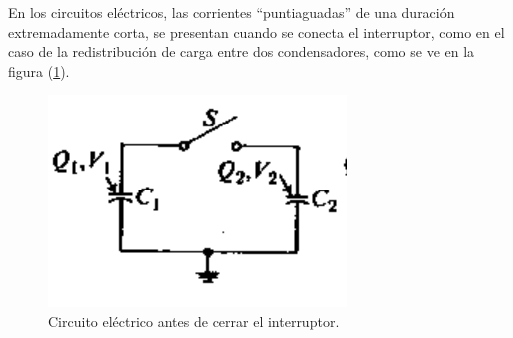 En los circuitos eléctricos, las corrientes \enquote{puntiaguadas} de una duración extremadamente corta, se presentan cuando se conecta el interruptor, como en el caso de la redistribución de carga entre dos condensadores, como se ve en la figura (\ref{fig_figura_delta_03}).
\begin{figure}[H]
    \centering
    \includegraphics[scale=0.5]{Imagenes/delta_dirac_03.png}
    \caption{Circuito eléctrico antes de cerrar el interruptor.}
    \label{fig_figura_delta_03}
\end{figure}
